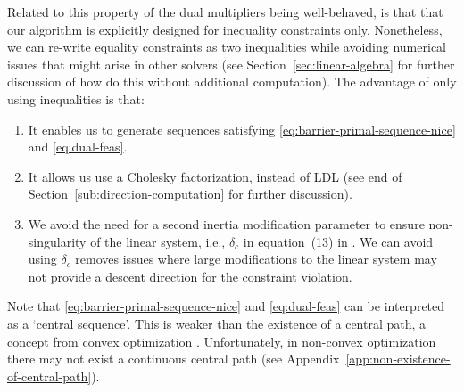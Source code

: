 \documentclass{article}
\begin{document}
Related to this property of the dual multipliers being well-behaved, is that that our algorithm is explicitly designed for inequality constraints only. Nonetheless, we can re-write equality constraints as two inequalities while avoiding numerical issues that might arise in other solvers \cite{haeser2017behavior}  (see Section~\ref{sec:linear-algebra} for further discussion of how do this without additional computation). The advantage of only using inequalities is that: 
\begin{enumerate}
\item It enables us to generate sequences satisfying \eqref{eq:barrier-primal-sequence-nice} and \eqref{eq:dual-feas}.
\item It allows us use a Cholesky factorization, instead of LDL (see end of Section~\ref{sub:direction-computation} for further discussion).
\item We avoid the need for a second inertia modification parameter to ensure non-singularity of the linear system, i.e., $\delta_{c}$ in equation~(13) in \cite{wachter2006implementation}.  We can avoid using $\delta_{c}$ removes issues where large modifications to the linear system may not provide a descent direction for the constraint violation. 
\end{enumerate}



Note that \eqref{eq:barrier-primal-sequence-nice} and \eqref{eq:dual-feas} can be interpreted as a `central sequence'. This is weaker than the existence of a central path, a concept from convex optimization \cite{megiddo1989pathways,andersen1999homogeneous}. Unfortunately, in non-convex optimization there may not exist a continuous central path (see Appendix~\ref{app:non-existence-of-central-path}).
\end{document}
